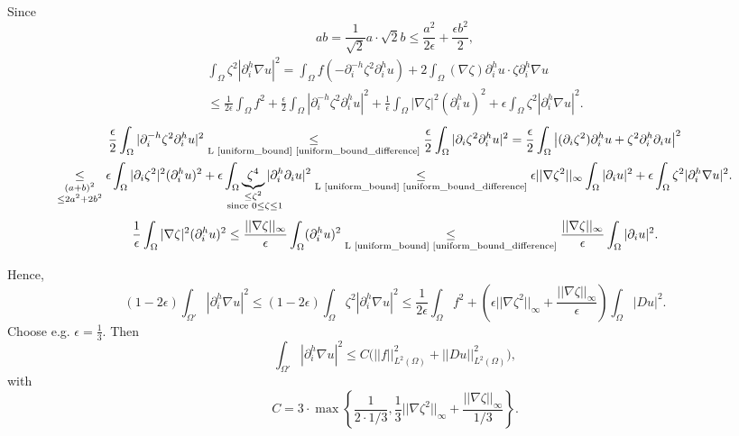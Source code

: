 \documentclass[12pt]{article}
\theoremstyle{definition}
\begin{document}
Since
\[ab=\frac{1}{\sqrt{2}}a\cdot\sqrt{2}b\leq\frac{a^2}{2\epsilon}+\frac{\epsilon b^2}{2},\]
\begin{multline*}
\int_{\Omega}\zeta^2|\partial_i^h\nabla u|^2=\int_{\Omega}f(-\partial_i^{-h}\zeta^2\partial_i^hu)+2\int_{\Omega}(\nabla\zeta)\partial_i^hu\cdot\zeta\partial_i^h\nabla u\\
\leq\frac{1}{2\epsilon}\int_{\Omega}f^2+\frac{\epsilon}{2}\int_{\Omega}|\partial_i^{-h}\zeta^2\partial_i^hu|^2+\frac{1}{\epsilon}\int_{\Omega}|\nabla\zeta|^2(\partial_i^hu)^2+\epsilon\int_{\Omega}\zeta^2|\partial_i^h\nabla u|^2.
\end{multline*}
\begin{multline*}
\frac{\epsilon}{2}\int_{\Omega}|\partial_i^{-h}\zeta^2\partial_i^hu|^2\underset{\text{L \ref{uniform_bound} \ref{uniform_bound_difference}}}{\leq}\frac{\epsilon}{2}\int_{\Omega}|\partial_i\zeta^2\partial_i^hu|^2=\frac{\epsilon}{2}\int_{\Omega}\big|(\partial_i\zeta^2)\partial_i^hu+\zeta^2\partial_i^h\partial_iu\big|^2\\
\underset{\substack{(a+b)^2\\\leq2a^2+2b^2}}{\leq}\epsilon\int_{\Omega}|\partial_i\zeta^2|^2(\partial_i^hu)^2+\epsilon\int_{\Omega}\underbrace{\zeta^4}_{\mathclap{\substack{\leq\zeta^2\\\text{ since }0\leq\zeta\leq1}}}|\partial_i^h\partial_iu|^2\underset{\text{L \ref{uniform_bound} \ref{uniform_bound_difference}}}{\leq}\epsilon||\nabla\zeta^2||_{\infty}\int_{\Omega}|\partial_iu|^2+\epsilon\int_{\Omega}\zeta^2|\partial_i^h\nabla u|^2.
\end{multline*}
\[\frac{1}{\epsilon}\int_{\Omega}|\nabla\zeta|^2(\partial_i^hu)^2\leq\frac{||\nabla\zeta||_{\infty}}{\epsilon}\int_{\Omega}(\partial_i^hu)^2\underset{\text{L \ref{uniform_bound} \ref{uniform_bound_difference}}}{\leq}\frac{||\nabla\zeta||_{\infty}}{\epsilon}\int_{\Omega}|\partial_iu|^2.\]

Hence,
\[(1-2\epsilon)\int_{\Omega'}|\partial_i^h\nabla u|^2\leq(1-2\epsilon)\int_{\Omega}\zeta^2|\partial_i^h\nabla u|^2\leq\frac{1}{2\epsilon}\int_{\Omega}f^2+\left(\epsilon||\nabla\zeta^2||_{\infty}+\frac{||\nabla\zeta||_{\infty}}{\epsilon}\right)\int_{\Omega}|Du|^2.\]
Choose e.g. $\epsilon=\frac{1}{3}$. Then
\[\int_{\Omega'}|\partial_i^h\nabla u|^2\leq C\big(||f||_{L^2(\Omega)}^2+||Du||_{L^2(\Omega)}^2\big),\]
with
\[C=3\cdot\max\left\{\frac{1}{2\cdot1/3},\frac{1}{3}||\nabla\zeta^2||_{\infty}+\frac{||\nabla\zeta||_{\infty}}{1/3}\right\}.\]

\end{document}
